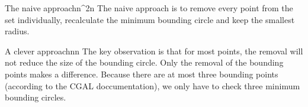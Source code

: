 \documentclass{writeup}
\begin{document}
\begin{solutions}
  \begin{solution}{The naive approach}{n^{2}}{n}
    The naive approach is to remove every point from the set individually, recalculate the minimum bounding circle and keep the smallest radius.
  \end{solution}

  \begin{solution}{A clever approach}{n}{n}
    The key observation is that for most points, the removal will not reduce the size of the bounding circle.
    Only the removal of the bounding points makes a difference.
    Because there are at most three bounding points (according to the CGAL doccumentation), we only have to check three minimum bounding circles.
  \end{solution}
\end{solutions}
\end{document}
